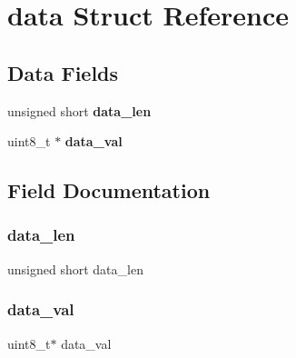 \hypertarget{structdata}{}\section{data Struct Reference}
\label{structdata}
\subsection*{Data Fields}
\begin{DoxyCompactItemize}
\item 
\hypertarget{structdata_a6f3d37631dba01e26032fe578e2f5d8d}{}\label{structdata_a6f3d37631dba01e26032fe578e2f5d8d} 
unsigned short {\bfseries data\+\_\+len}
\item 
\hypertarget{structdata_a2f4466e4bad9395ffd9a9c03b208d4eb}{}\label{structdata_a2f4466e4bad9395ffd9a9c03b208d4eb} 
uint8\+\_\+t $\ast$ {\bfseries data\+\_\+val}
\end{DoxyCompactItemize}


\subsection{Field Documentation}
\hypertarget{structdata_a6f3d37631dba01e26032fe578e2f5d8d}{}\label{structdata_a6f3d37631dba01e26032fe578e2f5d8d} 
\subsubsection{\texorpdfstring{data\+\_\+len}{data\_len}}
{\footnotesize\ttfamily unsigned short data\+\_\+len}

\hypertarget{structdata_a2f4466e4bad9395ffd9a9c03b208d4eb}{}\label{structdata_a2f4466e4bad9395ffd9a9c03b208d4eb} 
\subsubsection{\texorpdfstring{data\+\_\+val}{data\_val}}
{\footnotesize\ttfamily uint8\+\_\+t$\ast$ data\+\_\+val}


